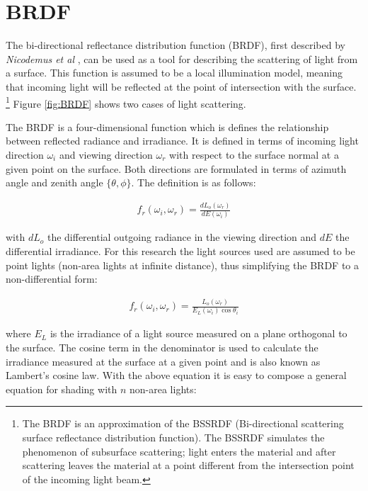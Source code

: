 \section{BRDF}

The bi-directional reflectance distribution function (BRDF), first described by {\it Nicodemus et al} \cite{Nicodemus}, can be used as a tool for describing the scattering of light from a surface. This function is assumed to be a local illumination model, meaning that incoming light will be reflected at the point of intersection with the surface. \footnote{The BRDF is an approximation of the BSSRDF (Bi-directional scattering surface reflectance distribution function). The BSSRDF simulates the phenomenon of subsurface scattering; light enters the material and after scattering leaves the material at a point different from the intersection point of the incoming light beam.} Figure \ref{fig:BRDF} shows two cases of light scattering.

The BRDF is a four-dimensional function which is defines the relationship between reflected radiance and irradiance. It is defined in terms of incoming light direction $\omega_i$ and viewing direction $\omega_r$ with respect to the surface normal at a given point on the surface. Both directions are formulated in terms of azimuth angle and zenith angle $\{\theta, \phi\}$. The definition is as follows:

		\begin{eqnarray*}
			f_r(\omega_i, \omega_r) = \frac{dL_o(\omega_r)}{dE(\omega_i)}
		\end{eqnarray*}

\noindent with $dL_o$ the differential outgoing radiance in the viewing direction and $dE$ the differential irradiance. For this research the light sources used are assumed to be point lights (non-area lights at infinite distance), thus simplifying the BRDF to a non-differential form:

		\begin{eqnarray*}
			f_r(\omega_i, \omega_r) = \frac{L_o(\omega_r)}{E_L(\omega_i)\cos \theta_i}
		\end{eqnarray*}

\noindent where $E_L$ is the irradiance of a light source measured on a plane orthogonal to the surface. The cosine term in the denominator is used to calculate the irradiance measured at the surface at a given point and is also known as Lambert's cosine law. With the above equation it is easy to compose a general equation for shading with $n$ non-area lights:

